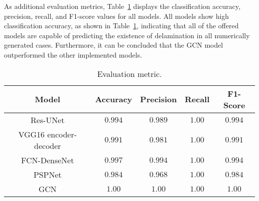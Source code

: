 As additional evaluation metrics, Table~\ref{tab:evaluation_metric} displays the classification accuracy, precision, recall, and F1-score values for all models.
All models show high classification accuracy, as shown in Table~\ref{tab:evaluation_metric}, indicating that all of the offered models are capable of predicting the existence of delamination in all numerically generated cases.
Furthermore, it can be concluded that the GCN model outperformed the other implemented models.
\begin{table}[]
	\centering
	\caption{Evaluation metric.}
	\label{tab:evaluation_metric}
	\resizebox{\textwidth}{!}
	{
		\begin{tabular}{ccccc} \hline
			Model& Accuracy & Precision & Recall & F1-Score \\ \hline
			Res-UNet & \(0.994\) & \(0.989\) & \(1.00\) & \(0.994\) \\ 
			VGG16 encoder-decoder & \(0.991\) & \(0.981\) & \(1.00\) & \(0.991\)\\ 
			FCN-DenseNet & \(0.997\) & \(0.994\) & \(1.00\) & \(0.994\) \\ 
			PSPNet & \(0.984\) & \(0.968\) & \(1.00\) & \(0.984\) \\ 
			GCN & \(1.00\) & \(1.00\) & \(1.00\) & \(1.00\) \\ \hline
		\end{tabular}
	}
\end{table}
